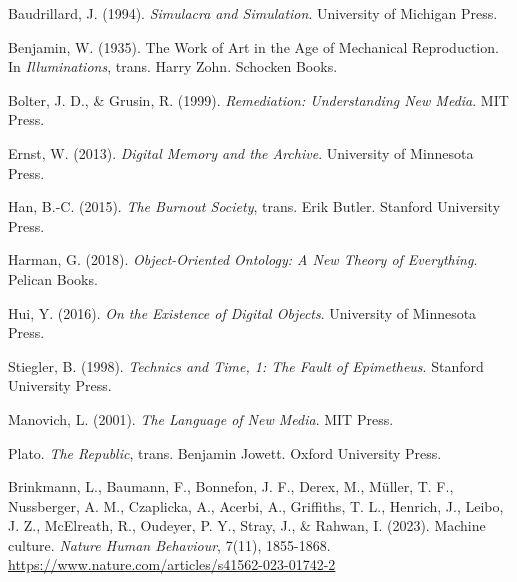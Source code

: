 \documentclass{article}
\begin{document}
\begin{thebibliography}{10}
 Baudrillard, J. (1994). \textit{Simulacra and Simulation}. University of Michigan Press.

 Benjamin, W. (1935). The Work of Art in the Age of Mechanical Reproduction. In \textit{Illuminations}, trans. Harry Zohn. Schocken Books.

 Bolter, J. D., \& Grusin, R. (1999). \textit{Remediation: Understanding New Media}. MIT Press.

 Ernst, W. (2013). \textit{Digital Memory and the Archive}. University of Minnesota Press.

 Han, B.-C. (2015). \textit{The Burnout Society}, trans. Erik Butler. Stanford University Press.

 Harman, G. (2018). \textit{Object-Oriented Ontology: A New Theory of Everything}. Pelican Books.

 Hui, Y. (2016). \textit{On the Existence of Digital Objects}. University of Minnesota Press.

 Stiegler, B. (1998). \textit{Technics and Time, 1: The Fault of Epimetheus}. Stanford University Press.

 Manovich, L. (2001). \textit{The Language of New Media}. MIT Press.

 Plato. \textit{The Republic}, trans. Benjamin Jowett. Oxford University Press.

 Brinkmann, L., Baumann, F., Bonnefon, J. F., Derex, M., Müller, T. F., Nussberger, A. M., Czaplicka, A., Acerbi, A., Griffiths, T. L., Henrich, J., Leibo, J. Z., McElreath, R., Oudeyer, P. Y., Stray, J., \& Rahwan, I. (2023). Machine culture. \textit{Nature Human Behaviour}, 7(11), 1855-1868. \url{https://www.nature.com/articles/s41562-023-01742-2}
\end{thebibliography}
\end{document}
